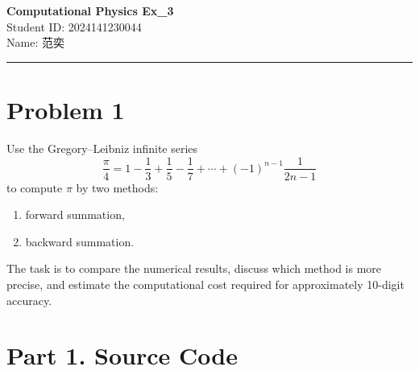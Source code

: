 \documentclass[12pt,a4paper]{article}
\newcommand{\HomeworkTitle}{Computational Physics Ex\_3}
\newcommand{\StudentID}{2024141230044}
\newcommand{\StudentName}{范奕}
\begin{document}
\begin{center}
    {\LARGE \textbf{\HomeworkTitle}}\\[1.2em]
    {\large Student ID: \StudentID}\\[0.5em]
    {\large Name: \StudentName}
\end{center}

\vspace{1em}
\noindent\rule{\textwidth}{0.8pt}
\vspace{1.5em}

\section*{Problem 1}

Use the Gregory--Leibniz infinite series
\[
\frac{\pi}{4}=1-\frac{1}{3}+\frac{1}{5}-\frac{1}{7}+\cdots+(-1)^{n-1}\frac{1}{2n-1}
\]
to compute $\pi$ by two methods:
\begin{enumerate}[label=(\arabic*)]
    \item forward summation,
    \item backward summation.
\end{enumerate}
The task is to compare the numerical results, discuss which method is more precise, and estimate the computational cost required for approximately 10-digit accuracy.

\newpage
\tableofcontents
\newpage

\section{Part 1. Source Code}
\end{document}
